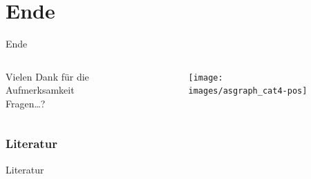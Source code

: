 \documentclass[ngerman,compress,hyperref={bookmarks}]{beamer}
\begin{document}
\part{Ende}
\begin{frame}[plain]{Ende}
\begin{columns}[t]
\begin{column}{0.5\textwidth}
 \begin{center}
 \vspace{1cm}
 Vielen Dank für die Aufmerksamkeit\\
 \vspace{1.5cm}
 Fragen\ldots?
 \end{center}
\end{column}
\begin{column}{0.5\textwidth}
 \vspace{-1cm}
 \begin{figure}
  \label{asngraphs2}
  \texttt{[image: images/asgraph\_cat4-pos]}
 \end{figure}
\end{column}
\end{columns}
\end{frame}

\section{Literatur}
\begin{frame}{Literatur}
\scriptsize

%

\end{frame}
\end{document}
